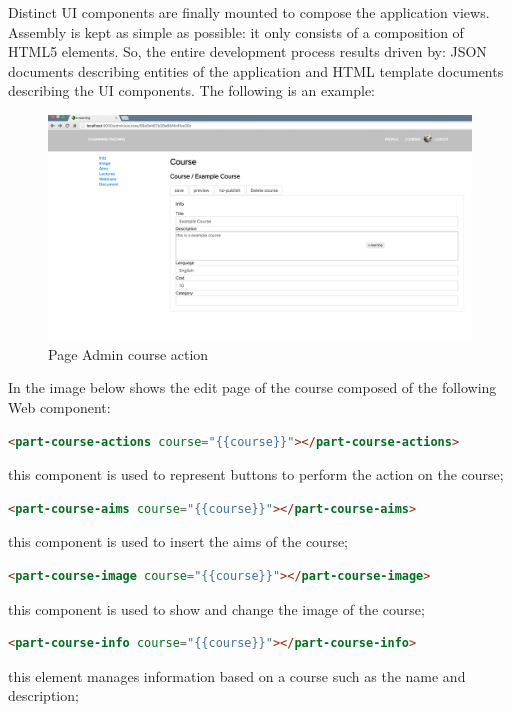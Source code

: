 Distinct UI components are finally mounted to compose the application views. Assembly is kept as simple as possible: it only consists of a composition of HTML5 elements. So, the entire development process results driven by: JSON documents describing entities of the application and HTML template documents describing the UI components.
{\color{red} The following is an example: }

\begin{figure}[htb] %
 \centering
 \includegraphics[width=1.0\linewidth]{images/chapter4/page-course-admin.png}\hfill
 \caption[Page Admin course action]{Page Admin course action}
 \label{fig:fourV}
\end{figure}

In the image below shows the edit page of the course composed of the following Web component:

\begin{lstlisting}[language=html]
<part-course-actions course="{{course}}"></part-course-actions>
\end{lstlisting}
this component is used to represent buttons to perform the action on the course;

\begin{lstlisting}[language=html]
<part-course-aims course="{{course}}"></part-course-aims>
\end{lstlisting}
this component is used to insert the aims of the course;

\begin{lstlisting}[language=html]
<part-course-image course="{{course}}"></part-course-image>
\end{lstlisting}
this component is used to show and change the image of the course;

\begin{lstlisting}[language=html]
<part-course-info course="{{course}}"></part-course-info>
\end{lstlisting}
this element manages information based on a course such as the name and description;


